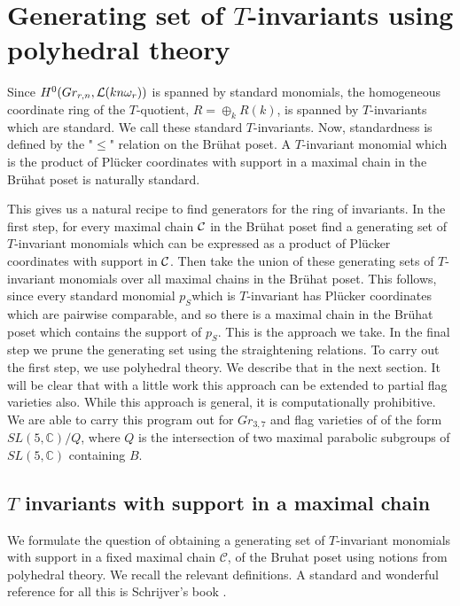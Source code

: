 \section{Generating set of $T$-invariants using polyhedral theory}
\label{hb_as_Tinv_gens}
Since $H^0(Gr_{r,n}, {\cal L}(kn\omega_r))$ is spanned by standard monomials, the homogeneous coordinate ring of the $T$-quotient, $R=\oplus_k R(k)$, is spanned by $T$-invariants which are standard. We call these standard $T$-invariants.  Now, standardness is defined by the "$\leq$" relation on the Br\"{u}hat poset. A $T$-invariant monomial which is the product of Pl\"{u}cker coordinates with support in a maximal chain in the Br\"{u}hat poset is naturally standard. 

This gives us a natural recipe to find generators for the ring of invariants. In the first step, for every maximal chain ${\cal C}$ in the Br\"{u}hat poset find a generating set of $T$-invariant monomials which can be expressed as a product of Pl\"{u}cker coordinates with support in ${\cal C}$. Then take the union of these generating sets of $T$-invariant monomials over all maximal chains in the Br\"{u}hat poset. This follows, since every standard monomial $p_{S}$which is $T$-invariant has Pl\"{u}cker coordinates which are pairwise comparable, and so there is a maximal chain in the Br\"{u}hat poset which contains the support of $p_{S}$.  This is the approach we take. In the final step we prune the generating set using the straightening relations. To carry out the first step, we use polyhedral theory. We describe that in the next section.  
It will be clear that with a little work this approach can be extended to partial flag varieties also.  While this approach is general, it is computationally prohibitive. We are able to carry this program out for $Gr_{3,7}$ and flag varieties of of the form $SL(5,{\mathbb C})/Q$, where $Q$ is the intersection of two maximal parabolic subgroups of $SL(5,{\mathbb C})$ containing $B$.   

\subsection{$T$ invariants with support in a maximal chain}
\label{sec:formulation}
We formulate the question of obtaining a generating set of $T$-invariant monomials with support in a fixed maximal chain ${\mathcal C}$, of the Bruhat poset using notions from polyhedral theory.  We recall the relevant definitions. A standard and wonderful reference for all this is Schrijver's book \cite{schrijver1998theory}. 

